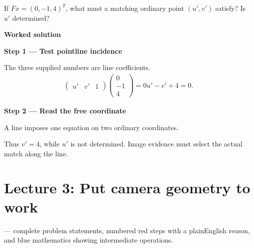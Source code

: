 \documentclass[letterpaper,11pt,english,openany,oneside]{jupyterBook}
\begin{document}
\sphinxAtStartPar
If \(Fx=(0,-1,4)^T\), what must a matching ordinary point \((u',v')\) satisfy? Is \(u'\) determined?

\par\medskip

\par\medskip
\textbf{Worked solution}\par\smallskip

\par\medskip{}
{\color{QuizStepRed}\bfseries Step 1 — Test point\sphinxhyphen{}line incidence}\par\smallskip

\sphinxAtStartPar
{} The three supplied numbers are line coefficients.
{\color{QuizMathBlue} \begin{equation*}
\begin{split}
\begin{pmatrix}u'&v'&1\end{pmatrix}\begin{pmatrix}0\\-1\\4\end{pmatrix}=0u'-v'+4=0.
\end{split}
\end{equation*}}
\par

\par\medskip{}
{\color{QuizStepRed}\bfseries Step 2 — Read the free coordinate}\par\smallskip

\sphinxAtStartPar
{} A line imposes one equation on two ordinary coordinates.

\sphinxAtStartPar
Thus {\color{QuizMathBlue} \(v'=4\)}, while {\color{QuizMathBlue} \(u'\)} is not determined. Image evidence must select the actual match along the line.

\par

\par\medskip

\sphinxstepscope


\chapter{Lecture 3: Put camera geometry to work}
\label{\detokenize{lectures/lecture03/index:lecture-3-put-camera-geometry-to-work}}\label{\detokenize{lectures/lecture03/index:lecture03}}\label{\detokenize{lectures/lecture03/index::doc}}
\sphinxAtStartPar
{} — complete problem statements, numbered red steps with a plain\sphinxhyphen{}English reason, and blue mathematics showing intermediate operations.
\end{document}
